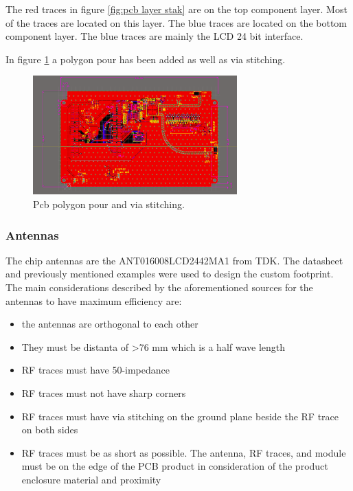 The red traces in figure \ref{fig:pcb layer stak} are on the top component layer. Most of the traces are located on this layer. The blue traces are located on the bottom component layer. The blue traces are mainly the LCD 24 bit interface.

In figure \ref{fig:pcb pour} a polygon pour has been added as well as via stitching.

\begin{figure}[h]
    \centering
    \includegraphics[width=0.7\textwidth,keepaspectratio]{chap/hardFig/pcb_polygon_pour}
    \caption{Pcb polygon pour and via stitching.}
    \label{fig:pcb pour}
\end{figure}

\subsubsection{Antennas}
The chip antennas are the ANT016008LCD2442MA1 from TDK. The datasheet and previously mentioned examples were used to design the custom footprint.
The main considerations described by the aforementioned sources for the antennas to have maximum efficiency are:

\begin{itemize}
  \item {the antennas are orthogonal to each other}
  \item {They must be distanta of >76 mm which is a half wave length}
  \item {RF traces must have 50-\textOmega impedance}
  \item {RF traces must not have sharp corners}
  \item {RF traces must have via stitching on the ground plane beside the RF trace on both sides}
  \item {RF traces must be as short as possible. The antenna, RF traces, and module must be on the edge of the PCB product in consideration of the product enclosure material and proximity}
\end{itemize}

